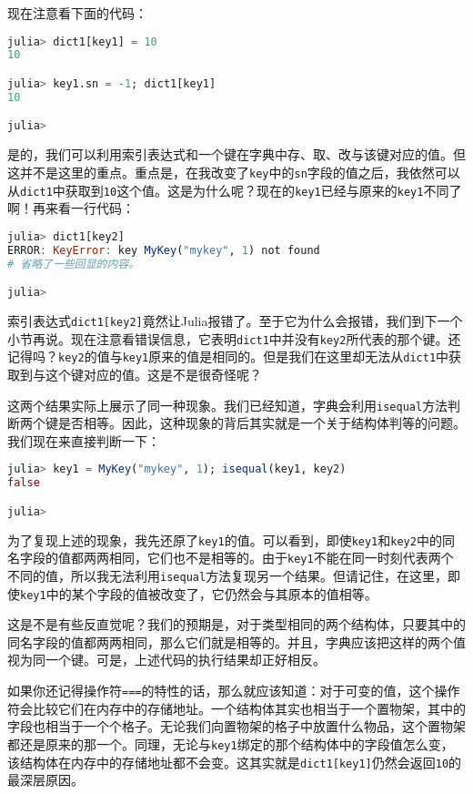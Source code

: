 现在注意看下面的代码：
\begin{lstlisting}[language=julia]
julia> dict1[key1] = 10
10

julia> key1.sn = -1; dict1[key1]
10

julia>
\end{lstlisting}

是的，我们可以利用索引表达式和一个键在字典中存、取、改与该键对应的值。但这并不是这里的重点。重点是，在我改变了\verb|key|中的\verb|sn|字段的值之后，我依然可以从\verb|dict1|中获取到\verb|10|这个值。这是为什么呢？现在的\verb|key1|已经与原来的\verb|key1|不同了啊！再来看一行代码：
\begin{lstlisting}[language=julia]
julia> dict1[key2]
ERROR: KeyError: key MyKey("mykey", 1) not found
# 省略了一些回显的内容。

julia> 
\end{lstlisting}

索引表达式\verb|dict1[key2]|竟然让Julia报错了。至于它为什么会报错，我们到下一个小节再说。现在注意看错误信息，它表明\verb|dict1|中并没有\verb|key2|所代表的那个键。还记得吗？\verb|key2|的值与\verb|key1|原来的值是相同的。但是我们在这里却无法从\verb|dict1|中获取到与这个键对应的值。这是不是很奇怪呢？

这两个结果实际上展示了同一种现象。我们已经知道，字典会利用\verb|isequal|方法判断两个键是否相等。因此，这种现象的背后其实就是一个关于结构体判等的问题。我们现在来直接判断一下：
\begin{lstlisting}[language=julia]
julia> key1 = MyKey("mykey", 1); isequal(key1, key2)
false

julia> 
\end{lstlisting}

为了复现上述的现象，我先还原了\verb|key1|的值。可以看到，即使\verb|key1|和\verb|key2|中的同名字段的值都两两相同，它们也不是相等的。由于\verb|key1|不能在同一时刻代表两个不同的值，所以我无法利用\verb|isequal|方法复现另一个结果。但请记住，在这里，即使\verb|key1|中的某个字段的值被改变了，它仍然会与其原本的值相等。

这是不是有些反直觉呢？我们的预期是，对于类型相同的两个结构体，只要其中的同名字段的值都两两相同，那么它们就是相等的。并且，字典应该把这样的两个值视为同一个键。可是，上述代码的执行结果却正好相反。

如果你还记得操作符\verb|===|的特性的话，那么就应该知道：对于可变的值，这个操作符会比较它们在内存中的存储地址。一个结构体其实也相当于一个置物架，其中的字段也相当于一个个格子。无论我们向置物架的格子中放置什么物品，这个置物架都还是原来的那一个。同理，无论与\verb|key1|绑定的那个结构体中的字段值怎么变，该结构体在内存中的存储地址都不会变。这其实就是\verb|dict1[key1]|仍然会返回\verb|10|的最深层原因。

